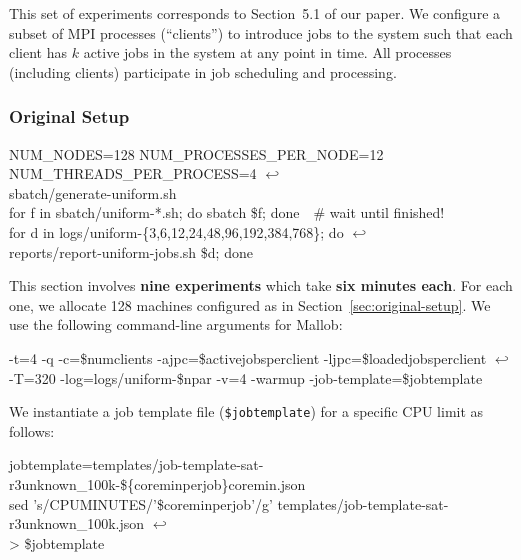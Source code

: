 \documentclass[runningheads]{article}
\newcommand{\CR}{{\tiny$\hookleftarrow$}}
\numberwithin{dummy}{subsection}
\begin{document}
This set of experiments corresponds to Section~5.1 of our paper.
We configure a subset of MPI processes (``clients'') to introduce jobs to the system such that each client has $k$ active jobs in the system at any point in time.
All processes (including clients) participate in job scheduling and processing.

\subsubsection{Original Setup}

\begin{tcolorbox}[
  colback=Magenta!5!white,
  colframe=Magenta!75!black,
  title={\centering Commands for Original Setup}]
\begin{ttfenvcompact}
NUM\_NODES=128 NUM\_PROCESSES\_PER\_NODE=12 NUM\_THREADS\_PER\_PROCESS=4 \CR\\
\hspace*{0.3cm}sbatch/generate-uniform.sh\\
for f in sbatch/uniform-*.sh; do sbatch \$f; done\ \ \# wait until finished!\\
for d in logs/uniform-\{3,6,12,24,48,96,192,384,768\}; do \CR\\ 
\hspace*{0.3cm}reports/report-uniform-jobs.sh \$d; done
\end{ttfenvcompact}
\end{tcolorbox}

This section involves \textbf{nine experiments} which take \textbf{six minutes each}.
For each one, we allocate 128 machines configured as in Section~\ref{sec:original-setup}.
We use the following command-line arguments for Mallob:

\begin{ttfenv}
-t=4 -q -c=\$numclients -ajpc=\$activejobsperclient -ljpc=\$loadedjobsperclient \CR\\
\hspace*{0.3cm}-T=320 -log=logs/uniform-\$npar -v=4 -warmup -job-template=\$jobtemplate
\end{ttfenv}

We instantiate a job template file (\texttt{\$jobtemplate}) for a specific CPU limit as follows:

\begin{ttfenv}
jobtemplate=templates/job-template-sat-r3unknown\_100k-\$\{coreminperjob\}coremin.json\\
sed 's/CPUMINUTES/'\$coreminperjob'/g' templates/job-template-sat-r3unknown\_100k.json \CR\\
\hspace*{0.3cm}> \$jobtemplate
\end{ttfenv}
\end{document}
